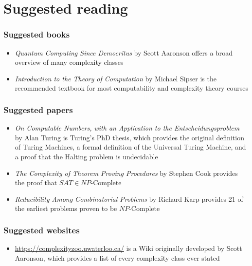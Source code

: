 \documentclass[aspectratio=169]{beamer}
\begin{document}
\section{Suggested reading}

\begin{frame}
\frametitle{Suggested books}
\begin{itemize}
    \item {\em Quantum Computing Since Democritus} by Scott Aaronson offers a broad overview of many complexity classes
    \item {\em Introduction to the Theory of Computation} by Michael Sipser is the recommended textbook for most computability and complexity theory courses
\end{itemize}
\end{frame}

\begin{frame}
\frametitle{Suggested papers}
\begin{itemize}
    \item {\em On Computable Numbers, with an Application to the Entscheidungsproblem} by Alan Turing is Turing's PhD thesis, which provides the original definition of Turing Machines, a formal definition of the Universal Turing Machine, and a proof that the Halting problem is undecidable
    \item {\em The Complexity of Theorem Proving Procedures} by Stephen Cook provides the proof that $SAT \in NP\text{-Complete}$
    \item {\em Reducibility Among Combinatorial Problems} by Richard Karp provides 21 of the earliest problems proven to be $NP\text{-Complete}$
\end{itemize}
\end{frame}

\begin{frame}
\frametitle{Suggested websites}
\begin{itemize}
    \item \url{https://complexityzoo.uwaterloo.ca/} is a Wiki originally developed by Scott Aaronson, which provides a list of every complexity class ever stated
\end{itemize}
\end{frame}

\end{document}
